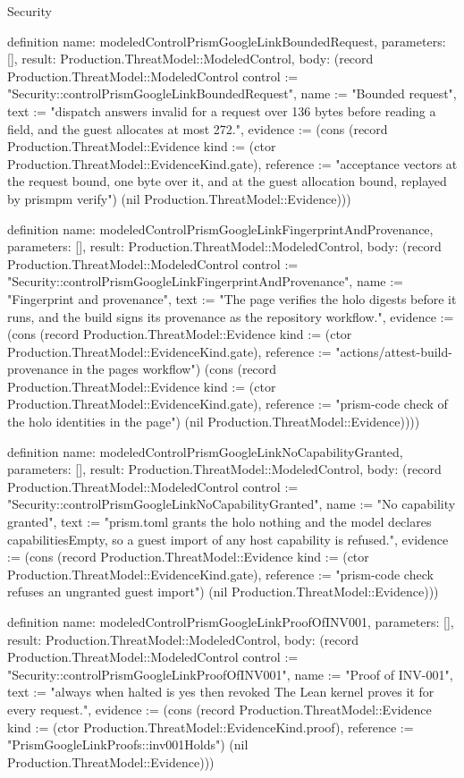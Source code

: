 \begin{lexlean}{Security}
\begin{semanticmodule}
definition{
  name: modeledControlPrismGoogleLinkBoundedRequest,
  parameters: [],
  result: Production.ThreatModel::ModeledControl,
  body: (record Production.ThreatModel::ModeledControl {control := "Security::controlPrismGoogleLinkBoundedRequest", name := "Bounded request", text := "dispatch answers invalid for a request over 136 bytes before reading a field, and the guest allocates at most 272.", evidence := (cons (record Production.ThreatModel::Evidence {kind := (ctor Production.ThreatModel::EvidenceKind.gate), reference := "acceptance vectors at the request bound, one byte over it, and at the guest allocation bound, replayed by prismpm verify"}) (nil Production.ThreatModel::Evidence))})
}

definition{
  name: modeledControlPrismGoogleLinkFingerprintAndProvenance,
  parameters: [],
  result: Production.ThreatModel::ModeledControl,
  body: (record Production.ThreatModel::ModeledControl {control := "Security::controlPrismGoogleLinkFingerprintAndProvenance", name := "Fingerprint and provenance", text := "The page verifies the holo digests before it runs, and the build signs its provenance as the repository workflow.", evidence := (cons (record Production.ThreatModel::Evidence {kind := (ctor Production.ThreatModel::EvidenceKind.gate), reference := "actions/attest-build-provenance in the pages workflow"}) (cons (record Production.ThreatModel::Evidence {kind := (ctor Production.ThreatModel::EvidenceKind.gate), reference := "prism-code check of the holo identities in the page"}) (nil Production.ThreatModel::Evidence)))})
}

definition{
  name: modeledControlPrismGoogleLinkNoCapabilityGranted,
  parameters: [],
  result: Production.ThreatModel::ModeledControl,
  body: (record Production.ThreatModel::ModeledControl {control := "Security::controlPrismGoogleLinkNoCapabilityGranted", name := "No capability granted", text := "prism.toml grants the holo nothing and the model declares capabilitiesEmpty, so a guest import of any host capability is refused.", evidence := (cons (record Production.ThreatModel::Evidence {kind := (ctor Production.ThreatModel::EvidenceKind.gate), reference := "prism-code check refuses an ungranted guest import"}) (nil Production.ThreatModel::Evidence))})
}

definition{
  name: modeledControlPrismGoogleLinkProofOfINV001,
  parameters: [],
  result: Production.ThreatModel::ModeledControl,
  body: (record Production.ThreatModel::ModeledControl {control := "Security::controlPrismGoogleLinkProofOfINV001", name := "Proof of INV-001", text := "always when halted is yes then revoked The Lean kernel proves it for every request.", evidence := (cons (record Production.ThreatModel::Evidence {kind := (ctor Production.ThreatModel::EvidenceKind.proof), reference := "PrismGoogleLinkProofs::inv001Holds"}) (nil Production.ThreatModel::Evidence))})
}


\end{semanticmodule}
\end{lexlean}
